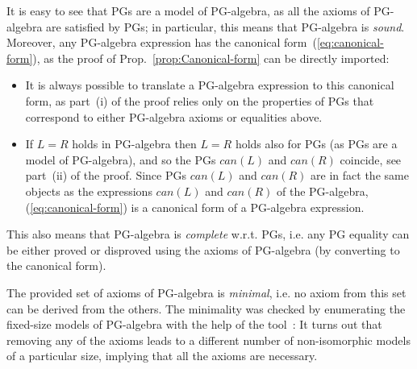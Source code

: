 It is easy to see that PGs are a model of PG-algebra, as all the axioms
of PG-algebra are satisfied by PGs; in particular, this means that
PG-algebra is \emph{sound}. Moreover, any PG-algebra expression has
the canonical form~(\ref{eq:canonical-form}), as the proof of Prop.~\ref{prop:Canonical-form}
can be directly imported: 
\begin{itemize}
\item It is always possible to translate a PG-algebra expression to this
canonical form, as part~(i) of the proof relies only on the properties
of PGs that correspond to either PG-algebra axioms or equalities above.
\item If $L=R$ holds in PG-algebra then $L=R$ holds also for PGs (as PGs
are a model of PG-algebra), and so the PGs $\mathit{can}(L)$ and
$\mathit{can}(R)$ coincide, see part~(ii) of the proof. Since PGs
$\mathit{can}(L)$ and $\mathit{can}(R)$ are in fact the same objects
as the expressions $\mathit{can}(L)$ and $\mathit{can}(R)$ of the
PG-algebra, (\ref{eq:canonical-form}) is a canonical form of a PG-algebra
expression.
\end{itemize}
This also means that PG-algebra is \emph{complete} w.r.t. PGs, i.e.
any PG equality can be either proved or disproved using the axioms
of PG-algebra (by converting to the canonical form). 

The provided set of axioms of PG-algebra is \emph{minimal}, i.e. no
axiom from this set can be derived from the others. The minimality
was checked by enumerating the fixed-size models of PG-algebra with
the help of the  tool~\cite{2011_bizjak_alg}: It turns
out that removing any of the axioms leads to a different number of
non-isomorphic models of a particular size, implying that all the
axioms are necessary.

